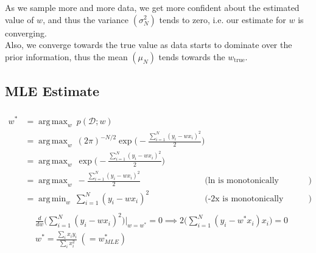 \documentclass[12pt, fleqn]{article}
\DeclareMathOperator*{\argmax}{arg\,max}
\DeclareMathOperator*{\argmin}{arg\,min}
\begin{document}
\subsubsection{}
As we sample more and more data, we get more confident about the estimated value of $w$, and thus the variance $(\sigma_N^2)$ tends to zero, i.e. our estimate for $w$ is converging. \\
Also, we converge towards the true value as data starts to dominate over the prior information, thus the mean $(\mu_N)$ tends towards the $w_{\text{true}}$.

\subsection{MLE Estimate}
\subsubsection{}
\begin{equation*}
  \begin{aligned}
    w^* & = \argmax_w \ p(\mathcal{D}; w)                                                                                                            \\
        & = \argmax_w \ (2 \pi)^{-N/2} \exp \bigg( -\frac{\sum_{i=1}^N (y_i - wx_i)^2}{2} \bigg)                                                     \\
        & = \argmax_w \ \exp \bigg( -\frac{\sum_{i=1}^N (y_i - wx_i)^2}{2} \bigg)                                                                    \\
        & = \argmax_w \ -\frac{\sum_{i=1}^N (y_i - wx_i)^2}{2}                                   & \text{(ln is monotonically increasing function})  \\
        & = \argmin_w \ \sum_{i=1}^N (y_i - wx_i)^2                                              & \text{(-2x is monotonically decreasing function}) \\
  \end{aligned}
\end{equation*}
\begin{equation*}
  \begin{aligned}
     & \frac{d}{dw} \bigg( \sum_{i=1}^N (y_i - wx_i)^2 \bigg) \bigg\vert_{w=w^*} = 0 \implies 2 \bigg( \sum_{i=1}^N (y_i - w^* x_i) x_i \bigg) = 0 \\
     & w^* = \frac{\sum_i x_i y_i}{\sum_i x_i^2} \ (= w^*_{MLE})
  \end{aligned}
\end{equation*}
\end{document}
